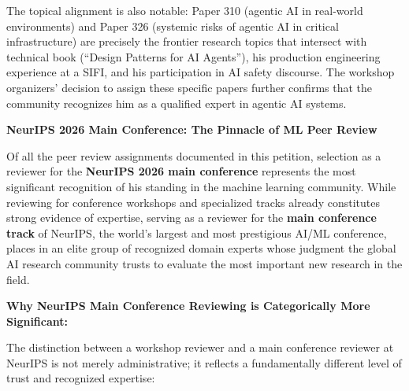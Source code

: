 The topical alignment is also notable: Paper 310 (agentic AI in real-world environments) and Paper 326 (systemic risks of agentic AI in critical infrastructure) are precisely the frontier research topics that intersect with \drs technical book (``Design Patterns for AI Agents''), his production engineering experience at a SIFI, and his participation in AI safety discourse. The workshop organizers' decision to assign \dr these specific papers further confirms that the community recognizes him as a qualified expert in agentic AI systems.



\textbf{NeurIPS 2026 Main Conference: The Pinnacle of ML Peer Review}

Of all the peer review assignments documented in this petition, \drs selection as a reviewer for the \textbf{NeurIPS 2026 main conference} represents the most significant recognition of his standing in the machine learning community. While reviewing for conference workshops and specialized tracks already constitutes strong evidence of expertise, serving as a reviewer for the \textbf{main conference track} of NeurIPS, the world's largest and most prestigious AI/ML conference, places \dr in an elite group of recognized domain experts whose judgment the global AI research community trusts to evaluate the most important new research in the field.

\textbf{Why NeurIPS Main Conference Reviewing is Categorically More Significant:}

The distinction between a workshop reviewer and a main conference reviewer at NeurIPS is not merely administrative; it reflects a fundamentally different level of trust and recognized expertise:

